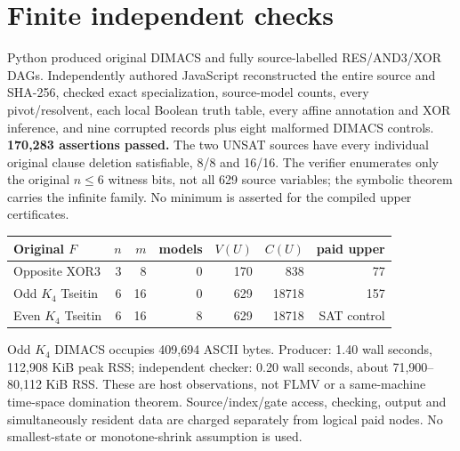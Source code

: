 \documentclass{article}
\begin{document}
\section*{Finite independent checks}
Python produced original DIMACS and fully source-labelled RES/AND3/XOR DAGs. Independently authored JavaScript reconstructed the entire source and SHA-256, checked exact specialization, source-model counts, every pivot/resolvent, each local Boolean truth table, every affine annotation and XOR inference, and nine corrupted records plus eight malformed DIMACS controls. \textbf{170,283 assertions passed.} The two UNSAT sources have every individual original clause deletion satisfiable, 8/8 and 16/16. The verifier enumerates only the original $n\le6$ witness bits, not all 629 source variables; the symbolic theorem carries the infinite family. No minimum is asserted for the compiled upper certificates.
\begin{center}
\begin{tabular}{lrrrrrr}\hline
Original $F$&$n$&$m$&models&$V(U)$&$C(U)$&paid upper\\\hline
Opposite XOR3&3&8&0&170&838&77\\
Odd $K_4$ Tseitin&6&16&0&629&18718&157\\
Even $K_4$ Tseitin&6&16&8&629&18718&SAT control\\\hline
\end{tabular}
\end{center}
Odd $K_4$ DIMACS occupies 409,694 ASCII bytes. Producer: 1.40 wall seconds, 112,908 KiB peak RSS; independent checker: 0.20 wall seconds, about 71,900--80,112 KiB RSS. These are host observations, not FLMV or a same-machine time-space domination theorem. Source/index/gate access, checking, output and simultaneously resident data are charged separately from logical paid nodes. No smallest-state or monotone-shrink assumption is used.
\end{document}
